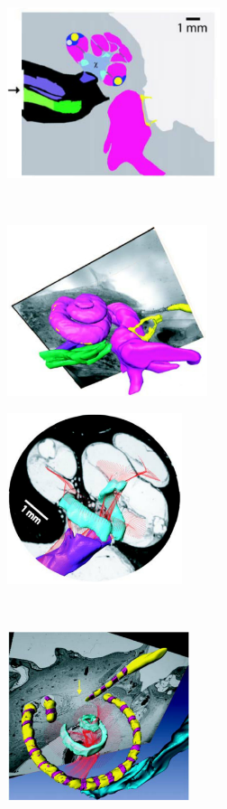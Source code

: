 \begin{figure}
	\centering
	
	\begin{subfigure}[t]{0.42\textwidth}
        \centering
        \includegraphics[height=5cm]{Background/whiten_1-segmentation}
        \caption{ }
        \label{fig:whiten_segment}
    \end{subfigure}%
    ~~
    \begin{subfigure}[t]{0.42\textwidth}
        \centering
        \includegraphics[height=5cm]{Background/whiten_2-anatomy}
        \caption{ }
        \label{fig:whiten_anatomy}
    \end{subfigure}%
    \vspace{4mm}    
    \begin{subfigure}[t]{0.42\textwidth}
        \centering
        \includegraphics[height=5cm]{Background/whiten_3-nerves}
        \caption{ }
        \label{fig:whiten_nerves}
    \end{subfigure}%
    ~~
    \begin{subfigure}[t]{0.42\textwidth}
        \centering
        \includegraphics[height=5cm]{Background/whiten_4-array}
        \caption{ }
        \label{fig:whiten_array}
    \end{subfigure}%
    

\end{figure}
